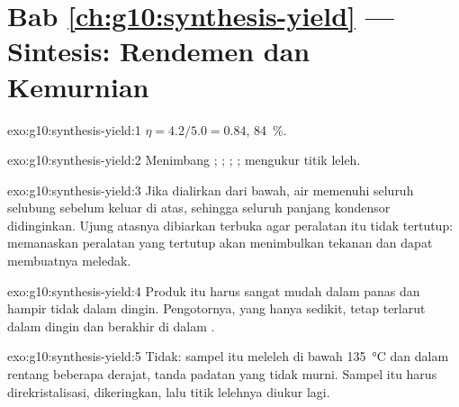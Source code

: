 \section*{Bab \ref{ch:g10:synthesis-yield} --- Sintesis: Rendemen dan Kemurnian}

\begin{solution}{exo:g10:synthesis-yield:1}
$\eta = 4.2 / 5.0 = 0.84$,  \qty{84}{\percent}.
\end{solution}

\begin{solution}{exo:g10:synthesis-yield:2}
Menimbang ; ;  ; ; mengukur titik leleh.
\end{solution}

\begin{solution}{exo:g10:synthesis-yield:3}
Jika dialirkan dari bawah, air memenuhi seluruh selubung sebelum keluar
di atas, sehingga seluruh panjang kondensor didinginkan. Ujung atasnya
dibiarkan terbuka agar peralatan itu tidak tertutup: memanaskan
peralatan yang tertutup akan menimbulkan tekanan dan dapat membuatnya
meledak.
\end{solution}

\begin{solution}{exo:g10:synthesis-yield:4}
Produk itu harus sangat mudah  dalam  panas dan hampir tidak
 dalam  dingin. Pengotornya, yang hanya sedikit, tetap
terlarut dalam  dingin dan berakhir di dalam .
\end{solution}

\begin{solution}{exo:g10:synthesis-yield:5}
Tidak: sampel itu meleleh di bawah \qty{135}{\celsius} dan dalam rentang
beberapa derajat, tanda padatan yang tidak murni. Sampel itu harus
direkristalisasi, dikeringkan, lalu titik lelehnya diukur lagi.
\end{solution}

